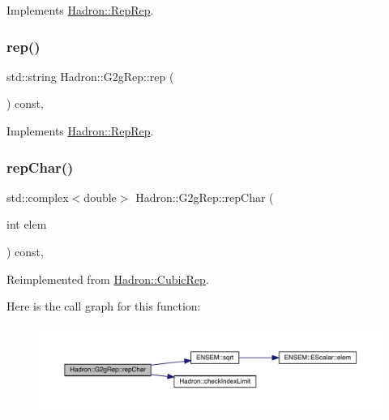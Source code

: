 Implements \mbox{\hyperlink{structHadron_1_1RepRep_ab3213025f6de249f7095892109575fde}{Hadron\+::\+Rep\+Rep}}.

\mbox{\label{structHadron_1_1G2gRep_a18380ef621e1c6761e5a8b3ff7170f87}} 
\subsubsection{\texorpdfstring{rep()}{rep()}\hspace{0.1cm}{\footnotesize\ttfamily [5/5]}}
{\footnotesize\ttfamily std\+::string Hadron\+::\+G2g\+Rep\+::rep (\begin{DoxyParamCaption}{ }\end{DoxyParamCaption}) const\hspace{0.3cm}{\ttfamily [inline]}, {\ttfamily [virtual]}}



Implements \mbox{\hyperlink{structHadron_1_1RepRep_ab3213025f6de249f7095892109575fde}{Hadron\+::\+Rep\+Rep}}.

\mbox{\label{structHadron_1_1G2gRep_ab31419c7383dac18c56c70f3ca7220a9}} 
\subsubsection{\texorpdfstring{repChar()}{repChar()}\hspace{0.1cm}{\footnotesize\ttfamily [1/3]}}
{\footnotesize\ttfamily std\+::complex$<$double$>$ Hadron\+::\+G2g\+Rep\+::rep\+Char (\begin{DoxyParamCaption}\item[{int}]{elem }\end{DoxyParamCaption}) const\hspace{0.3cm}{\ttfamily [inline]}, {\ttfamily [virtual]}}



Reimplemented from \mbox{\hyperlink{structHadron_1_1CubicRep_af45227106e8e715e84b0af69cd3b36f8}{Hadron\+::\+Cubic\+Rep}}.

Here is the call graph for this function\+:
\nopagebreak
\begin{figure}[H]
\begin{center}
\leavevmode
\includegraphics[width=350pt]{d9/d3e/structHadron_1_1G2gRep_ab31419c7383dac18c56c70f3ca7220a9_cgraph}
\end{center}
\end{figure}
\mbox{\label{structHadron_1_1G2gRep_ab31419c7383dac18c56c70f3ca7220a9}} 
